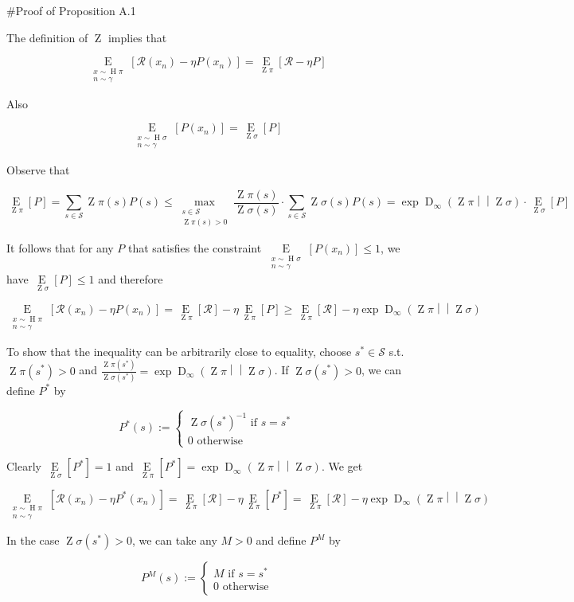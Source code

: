 \documentclass[a4paper]{article}
\newcommand{\AP}[1]{\left(#1\right)}
\newcommand{\AB}[1]{\left[#1\right]}
\newcommand{\Ea}[2]{\underset{#1}{\operatorname{E}}\AB{#2}}
\newcommand{\RD}[3]{\operatorname{D}_{#1}\AP{#2\middle\vert\middle\vert#3}}
\newcommand{\St}{\mathcal{S}}
\newcommand{\R}{\mathcal{R}}
\newcommand{\Pe}{P}
\DeclareMathOperator{\Hi}{H}
\DeclareMathOperator{\Z}{Z}
\begin{document}
\#Proof of Proposition A.1

The definition of $\Z$ implies that

$$\Ea{\substack{x\sim\Hi{\pi}\\n\sim\gamma}}{\R\AP{x_n}-\eta\Pe\AP{x_n}}=\Ea{\Z\pi}{\R-\eta P}$$

Also

$$\Ea{\substack{x\sim\Hi{\sigma}\\n\sim\gamma}}{\Pe\AP{x_n}}=\Ea{\Z{\sigma}}{P}$$

Observe that

$$\Ea{\Z{\pi}}{P} = \sum_{s\in\St}\Z{\pi}(s)P(s) \leq \max_{\substack{s \in \St \\ \Z{\pi}(s) > 0}}\frac{\Z{\pi}(s)}{\Z{\sigma}(s)}\cdot\sum_{s\in\St}\Z{\sigma}(s)P(s) = \exp{\RD{\infty}{\Z\pi}{\Z\sigma}} \cdot \Ea{\Z{\sigma}}{P}$$

It follows that for any $P$ that satisfies the constraint $\Ea{\substack{x\sim\Hi{\sigma}\\n\sim\gamma}}{\Pe\AP{x_n}} \leq 1$, we have $\Ea{\Z{\sigma}}{\Pe} \leq 1$ and therefore

$$\Ea{\substack{x\sim\Hi{\pi}\\n\sim\gamma}}{\R\AP{x_n}-\eta\Pe\AP{x_n}} = \Ea{\Z{\pi}}{\R} - \eta \Ea{\Z{\pi}}{\Pe} \geq \Ea{\Z{\pi}}{\R} - \eta\exp{\RD{\infty}{\Z\pi}{\Z\sigma}}$$

To show that the inequality can be arbitrarily close to equality, choose $s^* \in \St$ s.t. $\Z{\pi}(s^*) > 0$ and $\frac{\Z{\pi}\AP{s^*}}{\Z{\sigma}\AP{s^*}} = \exp{\RD{\infty}{\Z\pi}{\Z\sigma}}$. If $\Z{\sigma}\AP{s^*} > 0$, we can define $\Pe^*$ by

$$\Pe^*(s):=\begin{cases} \Z{\sigma}(s^*)^{-1} \text{ if } s=s^* \\ 0 \text{ otherwise} \end{cases}$$

Clearly $\Ea{\Z{\sigma}}{\Pe^*} = 1$ and $\Ea{\Z{\pi}}{P^*} = \exp{\RD{\infty}{\Z\pi}{\Z\sigma}}$. We get

$$\Ea{\substack{x\sim\Hi{\pi}\\n\sim\gamma}}{\R\AP{x_n}-\eta\Pe^*\AP{x_n}} = \Ea{\Z{\pi}}{\R} - \eta \Ea{\Z{\pi}}{\Pe^*} = \Ea{\Z{\pi}}{\R} - \eta\exp{\RD{\infty}{\Z\pi}{\Z\sigma}}$$

In the case $\Z{\sigma}\AP{s^*} > 0$, we can take any $M > 0$ and define $\Pe^M$ by

$$\Pe^M(s):=\begin{cases} M \text{ if } s=s^* \\ 0 \text{ otherwise} \end{cases}$$
\end{document}

